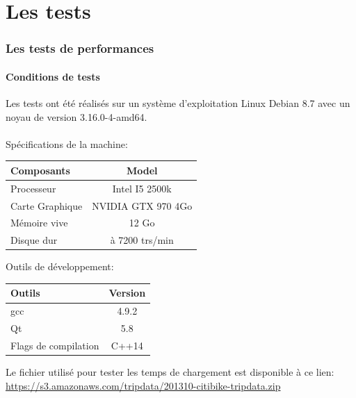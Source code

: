 \documentclass[12pt]{article}
\begin{document}
\newpage
\part{Les tests}
	\section{Les tests de performances} \label{tests_performances}
		\subsection{Conditions de tests}
		Les tests ont été réalisés sur un système d’exploitation Linux Debian 8.7 avec
		un noyau de version 3.16.0-4-amd64. \\ \\
		Spécifications de la machine: \\
		
		\begin{center}
			\begin{tabular}{| l | c |}
			\hline
			\textbf{Composants} & \textbf{Model} \\ \hline
			Processeur & Intel I5 2500k \\ \hline
			Carte Graphique & NVIDIA GTX 970 4Go \\ \hline
			Mémoire vive & 12 Go \\ \hline
			Disque dur & à 7200 trs/min \\ \hline
		    \end{tabular}
	    \end{center}
	    
	    Outils de développement: \\
	    \begin{center}
			\begin{tabular}{| l | c |}
			\hline
			\textbf{Outils} & \textbf{Version} \\ \hline
			gcc & 4.9.2 \\ \hline
			Qt & 5.8 \\ \hline
			Flags de compilation & C++14\\ \hline
		    \end{tabular}
	    \end{center}
	    
	    Le fichier utilisé pour tester les temps de chargement est disponible à ce lien:\\
		\url{https://s3.amazonaws.com/tripdata/201310-citibike-tripdata.zip}\\
		
\end{document}
